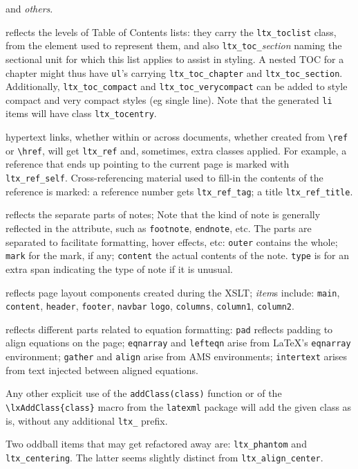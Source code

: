 \documentclass{book}
\begin{document}
\begin{description}
   and \emph{others}.
\item[\texttt{ltx\_toc\_}\textit{item}]
  reflects the levels of Table of Contents lists:
  they carry the  \texttt{ltx\_toclist} class, from the element used to represent them,
  and also \texttt{ltx\_toc\_}\textit{section} naming the sectional unit for 
  which this list applies to assist in styling.  A nested TOC for a chapter might
  thus have \texttt{ul}'s carrying \texttt{ltx\_toc\_chapter} and \texttt{ltx\_toc\_section}.
  Additionally, \texttt{ltx\_toc\_compact} and \texttt{ltx\_toc\_verycompact} can
  be added to style compact and very compact styles (eg single line).
  Note that the generated \texttt{li} items will have class \texttt{ltx\_tocentry}.
\item[\texttt{ltx\_ref\_}\textit{item}]
  hypertext links, whether within or across documents, whether created from
  \verb|\ref| or \verb|\href|, will get \texttt{ltx\_ref} and, sometimes, extra classes applied.
  For example, a reference that ends up pointing to the current page is
  marked with \texttt{ltx\_ref\_self}.
  Cross-referencing material used to fill-in the contents of the reference is marked:
  a reference number gets \texttt{ltx\_ref\_tag}; a title \texttt{ltx\_ref\_title}.
\item[\texttt{ltx\_note\_}\textit{part}]
  reflects the separate parts of notes;
  Note that the kind of note is generally reflected in the  attribute,
  such as \texttt{footnote}, \texttt{endnote}, etc.
  The parts are separated to facilitate formatting, hover effects, etc:
  \texttt{outer} contains the whole; \texttt{mark} for the mark, if any;
  \texttt{content} the actual contents of the note.
  \texttt{type} is for an extra span indicating the type of note if it is unusual.
\item[\texttt{ltx\_page\_}\textit{item}]
  reflects page layout components created during the XSLT;
  \textit{item}s include:
   \texttt{main}, \texttt{content}, \texttt{header}, \texttt{footer}, \texttt{navbar}
   \texttt{logo}, \texttt{columns}, \texttt{column1}, \texttt{column2}.
\item[\texttt{ltx\_eqn\_}\textit{item}]
  reflects different parts related to equation formatting:
  \texttt{pad} reflects padding to align equations on the page;
  \texttt{eqnarray} and \texttt{lefteqn} arise from \LaTeX's \texttt{eqnarray} environment;
  \texttt{gather} and \texttt{align} arise from AMS environments;
  \texttt{intertext} arises from text injected between aligned equations.
\end{description}

Any other explicit use of the \verb|addClass(class)| function or
of the \verb|\lxAddClass{class}| macro from the \texttt{latexml} package
will add the given class as is, without any additional \texttt{ltx\_} prefix.

Two oddball items that may get refactored away are:
\texttt{ltx\_phantom} and \texttt{ltx\_centering}.
The latter seems slightly distinct from \texttt{ltx\_align\_center}.
\backmatter
\printindex
\end{document}
